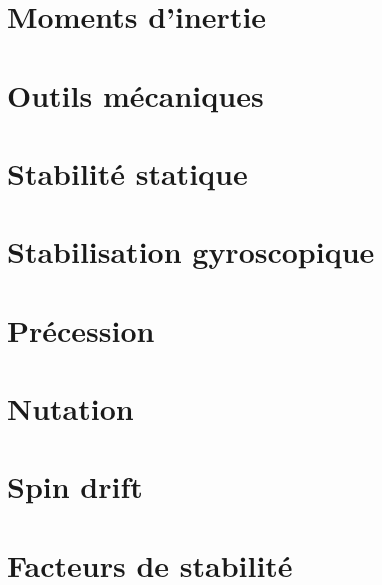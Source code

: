     \chapter{Moments d'inertie}
    \label{chap:moments_inertie}
    

    \chapter{Outils mécaniques}
    \label{chap:outils_mecaniques}
    

    \chapter{Stabilité statique}
    \label{chap:stabilite_statique}
    

    \chapter{Stabilisation gyroscopique}
    \label{chap:stabilisation_gyroscopique}
    

    \chapter{Précession}
    \label{chap:precession}
    

    \chapter{Nutation}
    \label{chap:nutation}
    

    \chapter{Spin drift}
    \label{chap:spin_drift}
    

    \chapter{Facteurs de stabilité}
    \label{chap:facteurs_stabilite}
    

